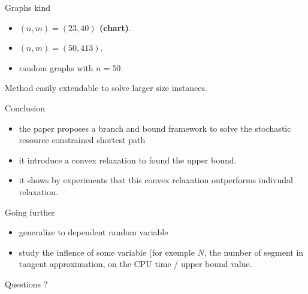\documentclass{beamer}
\begin{document}
\begin{frame}
	Graphs kind
	\begin{itemize}
		\item \textbf{$(n,m) = (23,40)$ (chart)}.
		\pause
		\item $(n,m) = (50,413)$.
		\pause
		\item random graphs with $n=50$.
	\end{itemize}
	\pause
	Method easily extendable to solve larger size instances.
\end{frame}

\begin{frame}
	\begin{block}{Conclusion}
		\begin{itemize}
			\pause
			\item the paper proposes a branch and bound framework to solve the stochastic resource constrained shortest path 
			\pause
			\item it introduce a convex relaxation to found the upper bound.
			\pause
			\item it shows by experiments that this convex relaxation outperforms indivudal relaxation.
		\end{itemize}
	\end{block}
	\pause
	\begin{block}{Going further}
		\begin{itemize}
			\item generalize to dependent random variable
			\pause
			\item study the inflence of some variable (for exemple $N$, the number of segment in tangent approximation, on the CPU time / upper bound value.
		\end{itemize}
	\end{block}
\end{frame}
\begin{frame}
	\begin{center}
	\LARGE{Questions ?}
	\end{center}
\end{frame}
\end{document}

